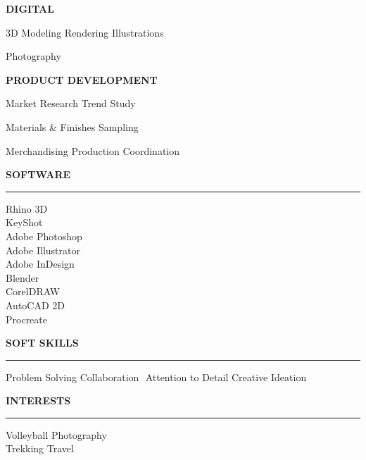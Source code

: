 \documentclass[a4paper]{article}
\newlength{\sidewidth}\setlength{\sidewidth}{7cm}
\newlength{\sidepad}\setlength{\sidepad}{0.55cm}
\newcommand{\sidesec}[1]{%
  \vspace{9pt}%
  {\fontsize{8}{10}\selectfont\bfseries\color{sidehead}%
   \MakeUppercase{#1}}\par\nobreak
  \vspace{1.5pt}%
  {\color{siderule}\rule{\linewidth}{0.3pt}}\par\nobreak
  \vspace{4pt}%
}
\newcommand{\skd}{\,\textperiodcentered\,}
\newcommand{\skillgroup}[1]{%
  {\fontsize{7.5}{9}\selectfont\bfseries\color{sidehead}%
   \MakeUppercase{#1}}\par\vspace{1pt}%
}
\begin{document}
\begin{minipage}[t][\paperheight]{\sidewidth}
\begin{minipage}[t]{\dimexpr\sidewidth-2\sidepad\relax}
\skillgroup{Digital}
{\small 3D Modeling\skd Rendering\skd Illustrations\par
Photography}\par
\vspace{5pt}

\skillgroup{Product Development}
{\small Market Research\skd Trend Study\par
Materials \& Finishes\skd Sampling\par
Merchandising\skd Production Coordination}

\sidesec{Software}
\small
{}\;Rhino 3D\\[2pt]
\;KeyShot\\[2pt]
\;Adobe Photoshop\\[2pt]
\;Adobe Illustrator\\[2pt]
\;Adobe InDesign\\[2pt]
\;Blender\\[2pt]
\;CorelDRAW\\[2pt]
\;AutoCAD 2D\\[2pt]
\;Procreate

\sidesec{Soft Skills}
\small
Problem Solving\skd Collaboration\skd
Attention to Detail\skd Creative Ideation

\sidesec{Interests}
\small
{}\;Volleyball\quad
{}\;Photography\\[3pt]
\;Trekking\quad
{}\;Travel

\end{minipage}%
\end{minipage}%
%
\end{document}
